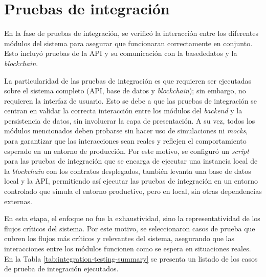 \section{Pruebas de integración}
\label{sec:integration-testing-details}

En la fase de pruebas de integración, se verificó la interacción entre los diferentes módulos del sistema para asegurar que funcionaran correctamente en conjunto. Esto incluyó pruebas de la API y su comunicación con la \gls{basededatos} y la \textit{\gls{blockchain}}. 

La particularidad de las pruebas de integración es que requieren ser ejecutadas sobre el sistema completo (API, base de datos y \textit{blockchain}); sin embargo, no requieren la interfaz de usuario. Esto se debe a que las pruebas de integración se centran en validar la correcta interacción entre los módulos del \textit{backend} y la persistencia de datos, sin involucrar la capa de presentación. A su vez, todos los módulos mencionados deben probarse sin hacer uso de simulaciones ni \textit{mocks}, para garantizar que las interacciones sean reales y reflejen el comportamiento esperado en un entorno de producción. Por este motivo, se configuró un \textit{script} para las pruebas de integración que se encarga de ejecutar una instancia local de la \textit{blockchain} con los contratos desplegados, también levanta una base de datos local y la API, permitiendo así ejecutar las pruebas de integración en un entorno controlado que simula el entorno productivo, pero en local, sin otras dependencias externas.

En esta etapa, el enfoque no fue la exhaustividad, sino la representatividad de los flujos críticos del sistema. Por este motivo, se seleccionaron casos de prueba que cubren los flujos más críticos y relevantes del sistema, asegurando que las interacciones entre los módulos funcionen como se espera en situaciones reales. En la Tabla \ref{tab:integration-testing-summary} se presenta un listado de los casos de prueba de integración ejecutados.

